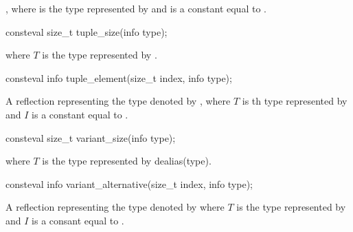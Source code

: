 \begin{itemdescr}
\pnum
\returns
{},
where  is the type represented by 
and  is a constant equal to .
\end{itemdescr}

%
\begin{itemdecl}
consteval size_t tuple_size(info type);
\end{itemdecl}

\begin{itemdescr}
\pnum
\returns
where $T$ is the type represented by .
\end{itemdescr}

%
\begin{itemdecl}
consteval info tuple_element(size_t index, info type);
\end{itemdecl}

\begin{itemdescr}
\pnum
\returns
A reflection representing
the type denoted by ,
where $T$ is th type represented by 
and $I$ is a constant equal to .
\end{itemdescr}

%
\begin{itemdecl}
consteval size_t variant_size(info type);
\end{itemdecl}

\begin{itemdescr}
\pnum
\returns
{}
where $T$ is the type represented by dealias(type).
\end{itemdescr}

%
\begin{itemdecl}
consteval info variant_alternative(size_t index, info type);
\end{itemdecl}

\begin{itemdescr}
\pnum
\returns
A reflection representing the type denoted by
where $T$ is the type represented by 
and $I$ is a consant equal to .
\end{itemdescr}

